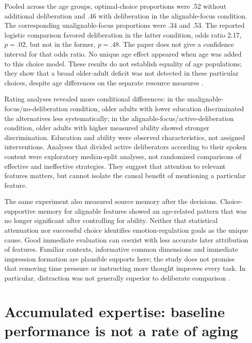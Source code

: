Pooled across the age groups, optimal-choice proportions were .52 without
additional deliberation and .46 with deliberation in the alignable-focus
condition. The corresponding unalignable-focus proportions were .34 and
.53. The reported logistic comparison favored deliberation in the latter
condition, odds ratio 2.17, \(p=.02\), but not in the former,
\(p=.48\). The paper does not give a confidence interval for that odds
ratio. No unique age effect appeared when age was added to this choice
model. These results do not establish equality of age populations; they
show that a broad older-adult deficit was not detected in these particular
choices, despite age differences on the separate resource measures
\cite[Results, table~3]{HessQueenPatterson2012Deliberation}.

Rating analyses revealed more conditional differences: in the
unalignable-focus/no-deliberation condition, older adults with lower
education discriminated the alternatives less systematically; in the
alignable-focus/active-deliberation condition, older adults with higher
measured ability showed stronger discrimination. Education and ability
were observed characteristics, not assigned interventions. Analyses that
divided active deliberators according to their spoken content were
exploratory median-split analyses, not randomized comparisons of effective
and ineffective strategies. They suggest that attention to relevant
features matters, but cannot isolate the causal benefit of mentioning a
particular feature.

The same experiment also measured source memory after the decisions.
Choice-supportive memory for alignable features showed an age-related
pattern that was no longer significant after controlling for ability.
Neither that statistical attenuation nor successful choice identifies
emotion-regulation goals as the unique cause. Good immediate evaluation
can coexist with less accurate later attribution of features. Familiar
contexts, informative common dimensions and immediate impression
formation are plausible supports here; the study does not promise that
removing time pressure or instructing more thought improves every task.
In particular, distraction was not generally superior to deliberate
comparison \cite[Results and Discussion]{HessQueenPatterson2012Deliberation}.

\section{Accumulated expertise: baseline performance is not a rate of aging}
\label{sec:p19-aging-expertise}

